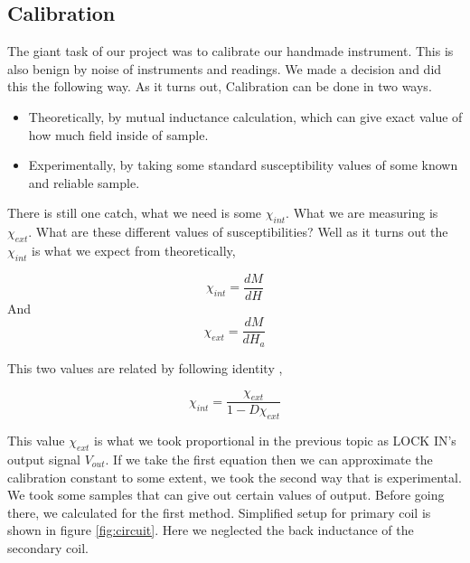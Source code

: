 \subsection{Calibration}


The giant task of our project was to calibrate our handmade instrument. This is also benign by noise of instruments and readings. We made a decision and did this the following way. As it turns out, Calibration can be done in two ways.\cite{cambr} 
\vskip1cm
\begin{itemize}
\item Theoretically, by mutual inductance calculation, which can give exact value of how much field inside of sample. \cite{10.1063/1.1137813}
\vskip1cm
\item Experimentally, by taking some standard susceptibility values of some known and reliable sample.
\end{itemize}
\vskip1cm
There is still one catch, what we need is some $\chi_{int}$\cite{cambr}. What we are measuring is $\chi_{ext}$. What are these different values of susceptibilities? Well as it turns out the $\chi_{int}$ is what we expect from theoretically, 


\begin{equation*}
\chi_{int} = \frac{dM}{dH}
\end{equation*}
 And 
\begin{equation*}
\chi_{ext} = \frac{dM}{dH_a}
\end{equation*}
 
This two values are related by following identity \cite{cambr},

\begin{equation*}
\chi_{int} = \frac{\chi_{ext}}{1-D\chi_{ext}}
\end{equation*}

This value $\chi_{ext}$ is what we took proportional in the previous topic as LOCK IN’s output signal $V_{out}$. If we take the first equation then we can approximate the calibration constant to some extent, we took the second way that is experimental. We took some samples that can give out certain values of output. Before going there, we calculated for the first method. Simplified setup for primary coil is shown in figure  \ref{fig:circuit}. Here we neglected the back inductance of the secondary coil.


